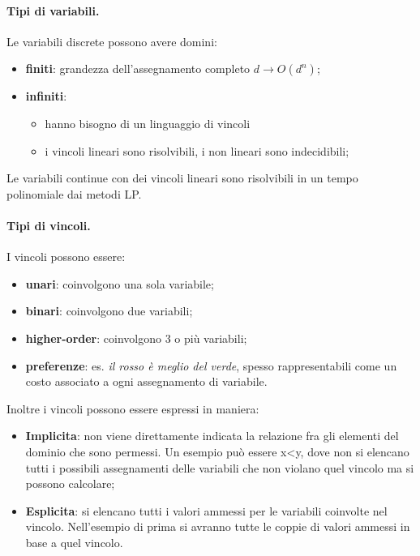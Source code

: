 \paragraph{Tipi di variabili.} Le variabili discrete possono avere domini:
\begin{itemize}
    \item \textbf{finiti}: grandezza dell'assegnamento completo $d \longrightarrow O(d^n)$;
    \item \textbf{infiniti}: \begin{itemize}
        \item hanno bisogno di un linguaggio di vincoli
        \item i vincoli lineari sono risolvibili, i non lineari sono indecidibili;
    \end{itemize}
\end{itemize}
Le variabili continue con dei vincoli lineari sono risolvibili in un tempo polinomiale dai metodi LP. 

\paragraph{Tipi di vincoli.} I vincoli possono essere:
\begin{itemize}
    \item \textbf{unari}: coinvolgono una sola variabile;
    \item \textbf{binari}: coinvolgono due variabili;
    \item \textbf{higher-order}: coinvolgono 3 o più variabili;
    \item \textbf{preferenze}: es. \textit{il rosso è meglio del verde}, spesso rappresentabili come un costo associato a ogni assegnamento di variabile.
\end{itemize}
Inoltre i vincoli possono essere espressi in maniera:
\begin{itemize}
    \item \textbf{Implicita}: non viene direttamente indicata la relazione fra gli elementi del dominio che sono permessi. Un esempio può essere x<y, dove non si elencano tutti i possibili assegnamenti delle variabili che non violano quel vincolo ma si possono calcolare;
    \item \textbf{Esplicita}: si elencano tutti i valori ammessi per le variabili coinvolte nel vincolo. Nell'esempio di prima si avranno tutte le coppie di valori ammessi in base a quel vincolo.
\end{itemize}

